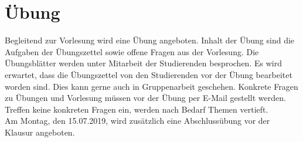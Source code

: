 \section{Übung}
Begleitend zur Vorlesung wird eine Übung angeboten. Inhalt der Übung sind die Aufgaben der Übungszettel sowie offene Fragen aus der Vorlesung. Die Übungsblätter werden unter Mitarbeit der Studierenden besprochen. Es wird erwartet, dass die Übungszettel von den Studierenden vor der Übung bearbeitet worden sind. Dies kann gerne auch in Gruppenarbeit geschehen. Konkrete Fragen zu Übungen und Vorlesung müssen vor der Übung per E-Mail  gestellt werden. Treffen keine konkreten Fragen ein, werden nach Bedarf Themen vertieft.\\
\noindent
Am Montag, den 15.07.2019, wird zusätzlich eine Abschlussübung vor der Klausur angeboten.